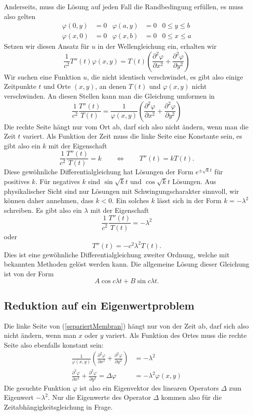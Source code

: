 Anderseits, muss die Lösung auf jeden Fall die Randbedingung erfüllen,
es muss also gelten
\begin{align*}
\varphi(0,y)&=0&\varphi(a,y)&=0&0\le y\le b\\
\varphi(x,0)&=0&\varphi(x,b)&=0&0\le x\le a
\end{align*}
Setzen wir diesen Ansatz für $u$ in der Wellengleichung ein,
erhalten wir
\[
\frac1{c^2}T''(t)\varphi(x,y)=T(t)\left(
\frac{\partial^2\varphi}{\partial x^2}
+
\frac{\partial^2\varphi}{\partial y^2}
\right)
\]
Wir suchen eine Funktion $u$, die nicht identisch verschwindet,
es gibt also einige Zeitpunkte $t$ und Orte $(x,y)$, an denen $T(t)$
und $\varphi(x,y)$ nicht verschwinden. An diesen Stellen kann man die
Gleichung umformen in
\begin{equation}
\frac1{c^2}\frac{T''(t)}{T(t)}
= \frac1{\varphi(x,y)}\left( \frac{\partial^2\varphi}{\partial x^2}
+ \frac{\partial^2\varphi}{\partial y^2} \right)
\label{separiertMembran}
\end{equation}
Die rechte Seite hängt nur
vom Ort ab, darf sich also nicht ändern, wenn man die Zeit $t$ variert.
Als Funktion der Zeit muss die linke Seite eine Konstante sein,
es gibt also ein $k$ mit der Eigenschaft
\[
\frac1{c^2}\frac{T''(t)}{T(t)}=k
\qquad\Leftrightarrow\qquad
T''(t)=k T(t).
\]
Diese gewöhnliche Differentialgleichung hat Lösungen der Form 
$e^{\pm\sqrt{k}t}$ für positives $k$. Für negatives $k$ sind $\sin\sqrt{k}t$ 
und $\cos\sqrt{k}t$ Lösungen.
Aus physikalischer Sicht sind nur Lösungen mit Schwingungscharakter sinnvoll,
wir können daher annehmen, dass $k<0$.
Ein solches $k$ lässt sich in der Form $k=-\lambda^2$ schreiben.
Es gibt also ein $\lambda$ mit der Eigenschaft
\[
\frac1{c^2}\frac{T''(t)}{T(t)}=-\lambda^2
\]
oder
\[
T''(t)=-c^2\lambda^2 T(t).
\]
Dies ist eine gewöhnliche Differentialgleichung zweiter Ordnung, welche mit
bekannten Methoden gelöst werden kann.
Die allgemeine Lösung dieser Gleichung ist von der Form
\[
A\cos c\lambda t+B\sin c\lambda t.
\]

\subsection{Reduktion auf ein Eigenwertproblem}
Die linke Seite von (\ref{separiertMembran}) hängt nur von der Zeit ab, darf sich
also nicht ändern, wenn man $x$ oder $y$ variert. Als Funktion des Ortes
muss die rechte Seite also ebenfalls konstant sein:
\begin{align*}
\frac1{\varphi(x,y)}\left(
\frac{\partial^2\varphi}{\partial x^2}
+
\frac{\partial^2\varphi}{\partial y^2}
\right)&=-\lambda^2\\
\frac{\partial^2\varphi}{\partial x^2}
+
\frac{\partial^2\varphi}{\partial y^2}
=\Delta\varphi
&=-\lambda^2
\varphi(x,y)
\end{align*}
Die gesuchte Funktion $\varphi$ ist also ein Eigenvektor des linearen
Operators $\Delta$ zum Eigenwert $-\lambda^2$.
Nur die Eigenwerte des Operator $\Delta$ kommen also für die
Zeitabhängigkeitsgleichung in Frage.

